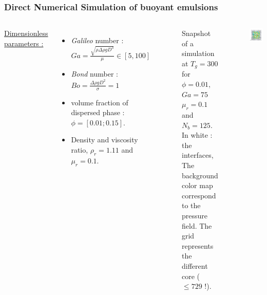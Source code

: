 \documentclass{sintefbeamer}
\begin{document}
\begin{frame}
  \frametitle{Direct Numerical Simulation of buoyant emulsions}
  \begin{columns}
  \underline{Dimensionless parameters :} 
  \begin{itemize}
    \item \textit{Galileo} number : $Ga =\frac{\sqrt{\rho \Delta\rho gD^3}}{\mu} \in [5, 100]$
    \item \textit{Bond} number : $Bo = \frac{\Delta \rho g D^2}{\sigma} = 1$ 
    \item volume fraction of dispersed phase : $\phi = [0.01;0.15]$. 
    \item Density and viscosity ratio, $\rho_r=1.11$ and $\mu_r= 0.1$. 
  \end{itemize}
  
  \begin{figure}
    \caption{Snapshot of a simulation at $T_g = 300$ for $\phi = 0.01$, $Ga = 75$ $\mu_r = 0.1$ and $N_b = 125$. In white : the interfaces, The background color map correspond to the pressure field. The grid represents the different core ($\le 729$ !).
    }
  \end{figure}
  \centering
  \href{file:///work/fintzin/BUBLLES_PROJECT/movies/cut.gif}{}
  \includegraphics[width =  1.1\textwidth]{image/PHI_01_Ga_75.png}
  \end{columns}
\end{frame}
\end{document}
